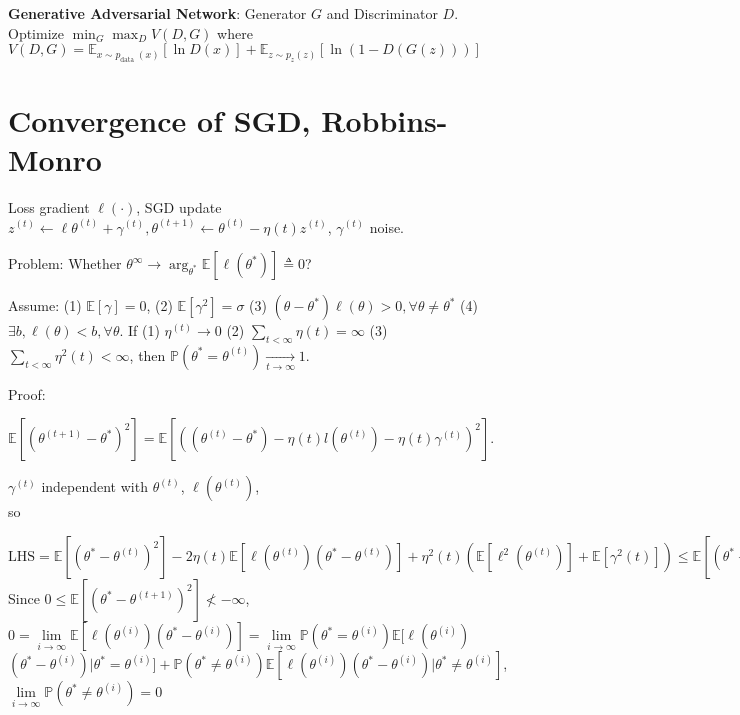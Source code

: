 \textbf{Generative Adversarial Network}: Generator $G$ and Discriminator $D$. Optimize $\min _{G} \max _{D} V(D, G)$ where $V(D, G) = \mathbb{E}_{x \sim p_{\text {data }}(x)}[\ln D(x)]+\mathbb{E}_{z \sim p_{z}(z)}[\ln (1-D(G(z)))]$



\section{Convergence of SGD, Robbins-Monro}
Loss gradient $\ell(\cdot)$, SGD update $z^{(t)} \leftarrow \ell \theta^{(t)}+\gamma^{(t)}, \theta^{(t+1)} \leftarrow \theta^{(t)}-\eta(t) z^{(t)}$, $\gamma^{(t)}$ noise.

Problem: Whether $\theta^{\infty}\to \arg_{\theta^*}\mathbb{E}[\ell (\theta^*)]\triangleq 0$?

Assume: (1) $\mathbb{E}[\gamma] = 0$, (2) $\mathbb{E}[\gamma^2] = \sigma$ (3) $\left(\theta-\theta^{*}\right) \ell(\theta)>0,\forall \theta\neq\theta^*$ (4) $\exists b,\ell(\theta) < b,\forall \theta$. If (1) $\eta^{(t)}\to 0$ (2) $\underset{t<\infty}{\sum} \eta(t)=\infty$ (3) $\underset{t<\infty}{\sum} \eta^{2}(t)<\infty$, then $\mathbb{P}\left(\theta^{*}=\theta^{(t)}\right) \underset{t \rightarrow \infty}{\longrightarrow} 1$.

Proof:
\begin{scriptsize}
    $\mathbb{E}[(\theta^{(t+1)}-\theta^{*})^{2}]=\mathbb{E}[((\theta^{(t)}-\theta^{*})-\eta(t) l(\theta^{(t)})-\eta(t) \gamma^{(t)})^2]$.
\end{scriptsize}
$\gamma^{(t)}$ independent with $\theta^{(t)}$, $\ell(\theta^{(t)})$,\\
so
\begin{footnotesize}
    $\text{LHS}=\mathbb{E}[(\theta^{*}-\theta^{(t)})^{2}]-2 \eta(t) \mathbb{E}[\ell(\theta^{(t)})(\theta^{*}-\theta^{(t)})]+\eta^{2}(t)(\mathbb{E}[\ell^{2}(\theta^{(t)})]+\mathbb{E}[\gamma^{2}(t)]) \leq \mathbb{E}[(\theta^{*}-\theta^{(0)})^{2}]-2\sum_{i\leq t} \eta(i) \mathbb{E}[\ell(\theta^{(i)})(\theta^{*}-\theta^{(i)})]+ \sum_{i \leq t} \eta^{2}(i)\left(b^{2}+\sigma^{2}\right)$ \\
    Since
    $0\leq \mathbb{E}[(\theta^{*}-\theta^{(t+1)})^{2}] \nless-\infty$, $0 =  \underset{i \rightarrow \infty}{\lim} \mathbb{E}[\ell(\theta^{(i)})(\theta^{*}-\theta^{(i)})]= \underset{i \rightarrow \infty}{\lim}\mathbb{P}(\theta^{*}=\theta^{(i)}) \mathbb{E}[\ell(\theta^{(i)})$\\$(\theta^{*}-\theta^{(i)}) | \theta^{*}=\theta^{(i)}]+ \mathbb{P}(\theta^{*} \neq \theta^{(i)}) \mathbb{E}[\ell(\theta^{(i)})(\theta^{*}-\theta^{(i)}) | \theta^{*} \neq \theta^{(i)}]$, $\underset{i \rightarrow \infty}{\lim} \mathbb{P}\left(\theta^{*} \neq \theta^{(i)}\right)=0$
\end{footnotesize}

